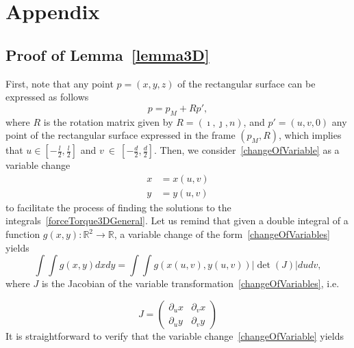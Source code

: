 \documentclass{article}
\begin{document}
\newpage
\section*{Appendix}
\subsection*{Proof of Lemma~\ref{lemma3D}}
First, note that any point $p=(x,y,z)$ of the rectangular surface can be expressed as follows
\begin{equation}
\label{changeOfVariable}
p = p_M + Rp',
\end{equation}
where $R$ is the rotation matrix given by $R = (\imath,\jmath,n)$, and $p'=(u,v,0)$ any point of the rectangular surface expressed in the frame $(p_M,R)$, which implies that $u\in \left[-\frac{l}{2},\frac{l}{2}\right]$ and
$v~\in~\left[-\frac{d}{2},\frac{d}{2}\right]$. Then, we consider~\eqref{changeOfVariable} as a variable change 
\begin{subequations}
	\label{changeOfVariables}
    \begin{alignat}{2}
x &= x(u,v) \label{xUvu}
\\
y &= y(u,v)  
\label{yUvi} 
    \end{alignat}
\end{subequations}
to facilitate the process of finding the solutions to the integrals~\eqref{forceTorque3DGeneral}. Let us  remind that given a double integral of a function $g(x,y): \mathbb{R}^2 \rightarrow \mathbb{R}$, a variable change of the form~\eqref{changeOfVariables} yields 
 \begin{equation}
 \int\int g(x,y) dx dy = \int\int g(x(u,v),y(u,v)) |\det(J)|dudv, 
\end{equation}
where $J$ is the Jacobian of the variable transformation~\eqref{changeOfVariables}, i.e.

\begin{equation}
\label{generalJacobian}
J =
\begin{pmatrix}
\partial_u x &  \partial_v x  \\
\partial_u y & \partial_v y
\end{pmatrix}
\end{equation}
It is straightforward to verify that the variable change~\eqref{changeOfVariable} yields
\end{document}
